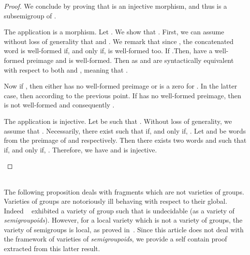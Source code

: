 \documentclass[submission,hidelink]{dmtcs-episciences}
\newenvironment{bulitem}
{\begin{list}{\rm }{\noindent \usecounter{enumi}\setlength{\topsep}{2pt}\setlength{\partopsep}{0pt}\setlength{\itemsep}{2pt}\setlength{\parsep}{0pt}\setlength{\leftmargin}{2.5em}\setlength{\labelwidth}{1.5em}\setlength{\labelsep}{0.5em}\setlength{\listparindent}{0pt}\setlength{\itemindent}{0pt}}}{\end{list}}
\begin{document}
\begin{proof}
		We conclude by proving that  is an injective morphism, and thus
		 is a subsemigroup of .
	\begin{bulitem}
		\item[The application  is a morphism.] Let . We show that
		.
		First, we can assume without loss of generality that  and .
		We remark that since ,
		the concatenated word  is well-formed if, and only if,
		 is well-formed too.
		If .Then,  have
		a well-formed preimage
		and  is well-formed.
		Then as  and  are syntactically equivalent with respect to
		both  and ,
		 meaning that .

		Now if , then either  has no well-formed preimage or
		 is a zero for .
		In the latter case, then  according to the previous point.
		If  has no well-formed preimage, then  is not well-formed
		and consequently .
		\item[The application  is injective.]
		Let  be such that . Without loss of generality, we  assume that .
		Necessarily, there exist  such that  if, and only if, .
		Let  and  be words from the preimage of  and  respectively.
		Then there exists two words  and  such that
		 if, and only if, . Therefore, we have  and  is injective.
	\end{bulitem}
	\end{proof}
\\

The following proposition deals with fragments which are not varieties of groups. Varieties of groups are notoriously ill behaving with respect to their global. Indeed ~\cite{Auinger10} exhibited a variety of group  such that
 is undecidable (as a variety of \emph{semigroupoids}). However, for a local variety  which is not a variety of groups, the
variety of semigroups  is local, as proved in~\cite{PapermanPhd}. Since this article does not deal with the framework
of varieties of \emph{semigroupoids}, we provide a self contain proof extracted from this latter result.
\end{document}
